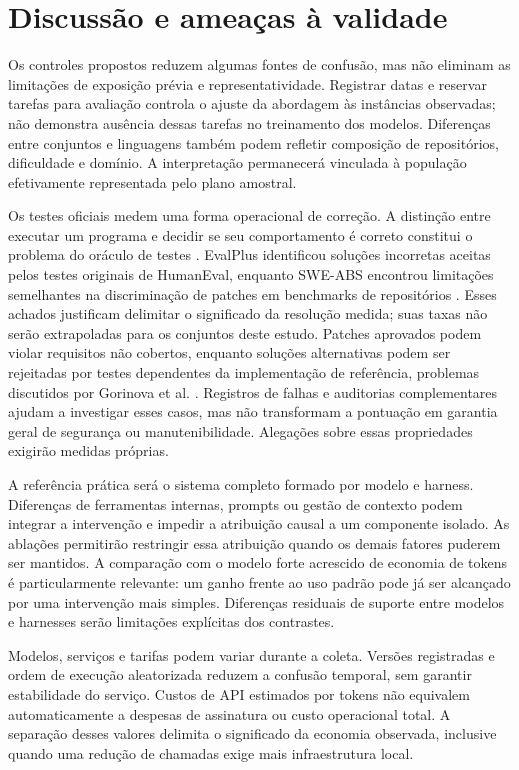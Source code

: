 \section{Discussão e ameaças à validade}

Os controles propostos reduzem algumas fontes de confusão, mas não eliminam as limitações de exposição prévia e representatividade. Registrar datas e reservar tarefas para avaliação controla o ajuste da abordagem às instâncias observadas; não demonstra ausência dessas tarefas no treinamento dos modelos. Diferenças entre conjuntos e linguagens também podem refletir composição de repositórios, dificuldade e domínio. A interpretação permanecerá vinculada à população efetivamente representada pelo plano amostral.

Os testes oficiais medem uma forma operacional de correção. A distinção entre executar um programa e decidir se seu comportamento é correto constitui o problema do oráculo de testes \cite{Barr2015Oracle}. EvalPlus identificou soluções incorretas aceitas pelos testes originais de HumanEval, enquanto SWE-ABS encontrou limitações semelhantes na discriminação de patches em benchmarks de repositórios \cite{Liu2023EvalPlus,Yu2026SWEABS}. Esses achados justificam delimitar o significado da resolução medida; suas taxas não serão extrapoladas para os conjuntos deste estudo. Patches aprovados podem violar requisitos não cobertos, enquanto soluções alternativas podem ser rejeitadas por testes dependentes da implementação de referência, problemas discutidos por Gorinova et al. \cite{Gorinova2026MisalignedBenchmarks}. Registros de falhas e auditorias complementares ajudam a investigar esses casos, mas não transformam a pontuação em garantia geral de segurança ou manutenibilidade. Alegações sobre essas propriedades exigirão medidas próprias.

A referência prática será o sistema completo formado por modelo e harness. Diferenças de ferramentas internas, prompts ou gestão de contexto podem integrar a intervenção e impedir a atribuição causal a um componente isolado. As ablações permitirão restringir essa atribuição quando os demais fatores puderem ser mantidos. A comparação com o modelo forte acrescido de economia de tokens é particularmente relevante: um ganho frente ao uso padrão pode já ser alcançado por uma intervenção mais simples. Diferenças residuais de suporte entre modelos e harnesses serão limitações explícitas dos contrastes.

Modelos, serviços e tarifas podem variar durante a coleta. Versões registradas e ordem de execução aleatorizada reduzem a confusão temporal, sem garantir estabilidade do serviço. Custos de API estimados por tokens não equivalem automaticamente a despesas de assinatura ou custo operacional total. A separação desses valores delimita o significado da economia observada, inclusive quando uma redução de chamadas exige mais infraestrutura local.

